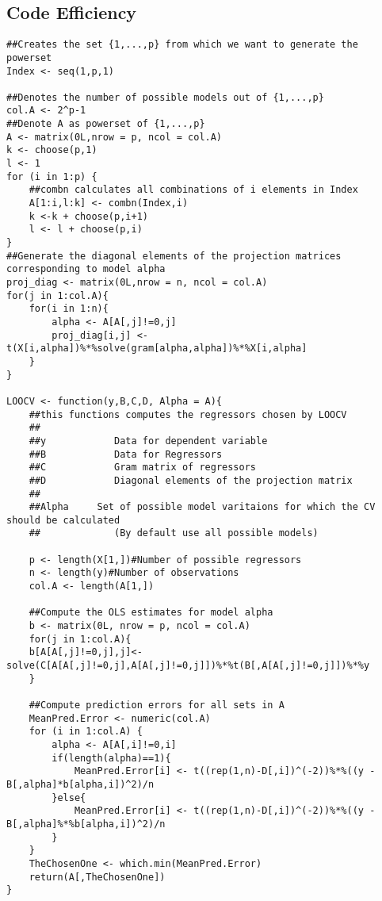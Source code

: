 \documentclass[Research_Module_ES.tex]{subfiles}
\begin{document}
\subsection{Code Efficiency}

\begin{lstlisting}[title={Leave-one-Out Cross-Validation Function}]
##Creates the set {1,...,p} from which we want to generate the powerset
Index <- seq(1,p,1)    

##Denotes the number of possible models out of {1,...,p}
col.A <- 2^p-1
##Denote A as powerset of {1,...,p}
A <- matrix(0L,nrow = p, ncol = col.A)      
k <- choose(p,1)
l <- 1
for (i in 1:p) {
	##combn calculates all combinations of i elements in Index 
	A[1:i,l:k] <- combn(Index,i)             
	k <-k + choose(p,i+1)
	l <- l + choose(p,i)
}
##Generate the diagonal elements of the projection matrices corresponding to model alpha
proj_diag <- matrix(0L,nrow = n, ncol = col.A)
for(j in 1:col.A){
	for(i in 1:n){
		alpha <- A[A[,j]!=0,j]
		proj_diag[i,j] <- t(X[i,alpha])%*%solve(gram[alpha,alpha])%*%X[i,alpha]
	}
}

LOOCV <- function(y,B,C,D, Alpha = A){
	##this functions computes the regressors chosen by LOOCV
	##
	##y            Data for dependent variable
	##B            Data for Regressors
	##C            Gram matrix of regressors
	##D            Diagonal elements of the projection matrix
	##
	##Alpha     Set of possible model varitaions for which the CV should be calculated 
	##             (By default use all possible models)  

	p <- length(X[1,])#Number of possible regressors
	n <- length(y)#Number of observations
	col.A <- length(A[1,])

	##Compute the OLS estimates for model alpha
	b <- matrix(0L, nrow = p, ncol = col.A)
	for(j in 1:col.A){
	b[A[A[,j]!=0,j],j]<- solve(C[A[A[,j]!=0,j],A[A[,j]!=0,j]])%*%t(B[,A[A[,j]!=0,j]])%*%y
	}

	##Compute prediction errors for all sets in A
	MeanPred.Error <- numeric(col.A)
	for (i in 1:col.A) {
		alpha <- A[A[,i]!=0,i]
		if(length(alpha)==1){
			MeanPred.Error[i] <- t((rep(1,n)-D[,i])^(-2))%*%((y - B[,alpha]*b[alpha,i])^2)/n
		}else{
			MeanPred.Error[i] <- t((rep(1,n)-D[,i])^(-2))%*%((y - B[,alpha]%*%b[alpha,i])^2)/n 
		}
	}
	TheChosenOne <- which.min(MeanPred.Error)
	return(A[,TheChosenOne])
}
\end{lstlisting}
\end{document}
